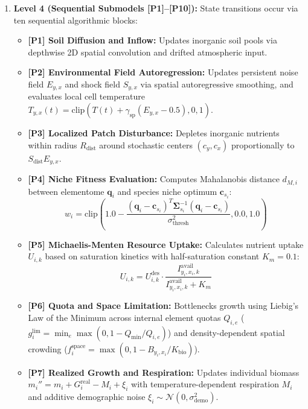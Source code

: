 \documentclass[11pt,a4paper]{article}
\begin{document}
\begin{enumerate}
    \item \textbf{Level 4 (Sequential Submodels [P1]--[P10]):} State transitions occur via ten sequential algorithmic blocks:
    \begin{itemize}
        \item \textbf{[P1] Soil Diffusion and Inflow:} Updates inorganic soil pools via depthwise 2D spatial convolution and drifted atmospheric input.
        \item \textbf{[P2] Environmental Field Autoregression:} Updates persistent noise field $E_{y,x}$ and shock field $S_{y,x}$ via spatial autoregressive smoothing, and evaluates local cell temperature $T_{y,x}(t) = \text{clip}(T(t) + \gamma_{\text{sp}}(E_{y,x} - 0.5), 0, 1)$.
        \item \textbf{[P3] Localized Patch Disturbance:} Depletes inorganic nutrients within radius $R_{\text{dist}}$ around stochastic centers $(c_y, c_x)$ proportionally to $S_{\text{dist}} E_{y,x}$.
        \item \textbf{[P4] Niche Fitness Evaluation:} Computes Mahalanobis distance $d_{M,i}$ between elementome $\boldsymbol{q}_i$ and species niche optimum $\boldsymbol{c}_{s_i}$:
        \begin{equation}
        w_i = \text{clip}\left(1.0 - \frac{(\boldsymbol{q}_i - \boldsymbol{c}_{s_i})^T \boldsymbol{\Sigma}_{s_i}^{-1} (\boldsymbol{q}_i - \boldsymbol{c}_{s_i})}{\sigma_{\text{thresh}}^2}, 0.0, 1.0\right)
        \end{equation}
        \item \textbf{[P5] Michaelis-Menten Resource Uptake:} Calculates nutrient uptake $U_{i,k}$ based on saturation kinetics with half-saturation constant $K_m = 0.1$:
        \begin{equation}
        U_{i,k} = U^{\text{des}}_{i,k} \cdot \frac{I^{\text{avail}}_{y_i, x_i, k}}{I^{\text{avail}}_{y_i, x_i, k} + K_m}
        \end{equation}
        \item \textbf{[P6] Quota and Space Limitation:} Bottlenecks growth using Liebig's Law of the Minimum across internal element quotas $Q_{i,e}$ ($g_i^{\text{lim}} = \min_e \max(0, 1 - Q_{\min}/Q_{i,e})$) and density-dependent spatial crowding ($f_i^{\text{space}} = \max(0, 1 - B_{y_i,x_i}/K_{\text{bio}})$).
        \item \textbf{[P7] Realized Growth and Respiration:} Updates individual biomass $m_i'' = m_i + G_i^{\text{real}} - M_i + \xi_i$ with temperature-dependent respiration $M_i$ and additive demographic noise $\xi_i \sim \mathcal{N}(0, \sigma_{\text{demo}}^2)$.

\end{itemize}
\end{enumerate}
\end{document}
